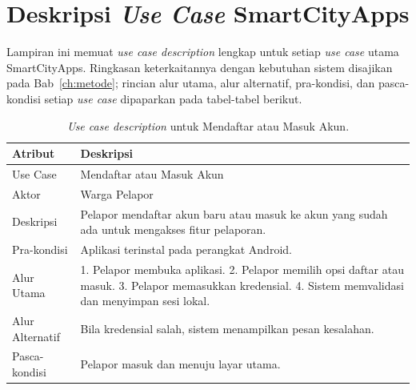 \chapter{Deskripsi \textit{Use Case} SmartCityApps}
\label{app:usecase-detail}

Lampiran ini memuat \textit{use case description} lengkap untuk setiap \textit{use case} utama SmartCityApps. Ringkasan keterkaitannya dengan kebutuhan sistem disajikan pada Bab~\ref{ch:metode}; rincian alur utama, alur alternatif, pra-kondisi, dan pasca-kondisi setiap \textit{use case} dipaparkan pada tabel-tabel berikut.

\begin{table}[htbp]
\centering
\caption{\textit{Use case description} untuk Mendaftar atau Masuk Akun.}
\label{tab:uc-auth}
\begin{tabular}{p{3.5cm} p{9cm}}
\toprule
\textbf{Atribut} & \textbf{Deskripsi} \\
\midrule
Use Case & Mendaftar atau Masuk Akun \\
Aktor & Warga Pelapor \\
Deskripsi & Pelapor mendaftar akun baru atau masuk ke akun yang sudah ada untuk mengakses fitur pelaporan. \\
Pra-kondisi & Aplikasi terinstal pada perangkat Android. \\
Alur Utama & 1. Pelapor membuka aplikasi. 2. Pelapor memilih opsi daftar atau masuk. 3. Pelapor memasukkan kredensial. 4. Sistem memvalidasi dan menyimpan sesi lokal. \\
Alur Alternatif & Bila kredensial salah, sistem menampilkan pesan kesalahan. \\
Pasca-kondisi & Pelapor masuk dan menuju layar utama. \\
\bottomrule
\end{tabular}
\end{table}

